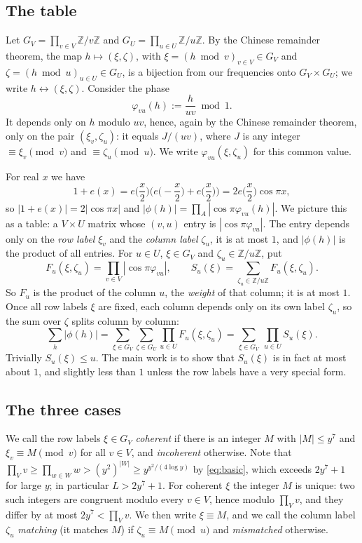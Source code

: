 \documentclass[11pt]{amsart}
\theoremstyle{definition}
\theoremstyle{remark}
\newcommand{\Z}{\mathbb{Z}}
\begin{document}
\subsection{The table}
Let $G_V=\prod_{v\in V}\Z/v\Z$ and $G_U=\prod_{u\in U}\Z/u\Z$. By the Chinese remainder theorem, the map $h\mapsto(\xi,\zeta)$, with $\xi=(h\bmod v)_{v\in V}\in G_V$ and $\zeta=(h\bmod u)_{u\in U}\in G_U$, is a bijection from our frequencies onto $G_V\times G_U$; we write $h\leftrightarrow(\xi,\zeta)$. Consider the phase
\[
 \varphi_{vu}(h):=\frac h{uv}\bmod1 .
\]
It depends only on $h$ modulo $uv$, hence, again by the Chinese remainder theorem, only on the pair $(\xi_v,\zeta_u)$: it equals $J/(uv)$, where $J$ is any integer $\equiv\xi_v\pmod v$ and $\equiv\zeta_u\pmod u$. We write $\varphi_{vu}(\xi,\zeta_u)$ for this common value.

For real $x$ we have
\begin{equation}\label{eq:half}
 1+e(x)=e\Big(\frac x2\Big)\Big(e\Big(-\frac x2\Big)+e\Big(\frac x2\Big)\Big)=2e\Big(\frac x2\Big)\cos\pi x ,
\end{equation}
so $|1+e(x)|=2|\cos\pi x|$ and $|\phi(h)|=\prod_A|\cos\pi\varphi_{vu}(h)|$. We picture this as a table: a $V\times U$ matrix whose $(v,u)$ entry is $|\cos\pi\varphi_{vu}|$. The entry depends only on the \emph{row label} $\xi_v$ and the \emph{column label} $\zeta_u$, it is at most $1$, and $|\phi(h)|$ is the product of all entries. For $u\in U$, $\xi\in G_V$ and $\zeta_u\in\Z/u\Z$, put
\[
 F_u(\xi,\zeta_u)=\prod_{v\in V}|\cos\pi\varphi_{vu}|,\qquad S_u(\xi)=\sum_{\zeta_u\in\Z/u\Z}F_u(\xi,\zeta_u).
\]
So $F_u$ is the product of the column $u$, the \emph{weight} of that column; it is at most $1$. Once all row labels $\xi$ are fixed, each column depends only on its own label $\zeta_u$, so the sum over $\zeta$ splits column by column:
\begin{equation}\label{eq:factor}
 \sum_{h}|\phi(h)|=\sum_{\xi\in G_V}\sum_{\zeta\in G_U}\prod_{u\in U}F_u(\xi,\zeta_u)=\sum_{\xi\in G_V}\ \prod_{u\in U}S_u(\xi).
\end{equation}
Trivially $S_u(\xi)\le u$. The main work is to show that $S_u(\xi)$ is in fact at most about $1$, and slightly less than $1$ unless the row labels have a very special form.

\subsection{The three cases}
We call the row labels $\xi\in G_V$ \emph{coherent} if there is an integer $M$ with $|M|\le y^7$ and $\xi_v\equiv M\pmod v$ for all $v\in V$, and \emph{incoherent} otherwise. Note that $\prod_Vv\ge\prod_{w\in W}w>(y^2)^{|W|}\ge y^{y^2/(4\log y)}$ by \eqref{eq:basic}, which exceeds $2y^7+1$ for large $y$; in particular $L>2y^7+1$. For coherent $\xi$ the integer $M$ is unique: two such integers are congruent modulo every $v\in V$, hence modulo $\prod_Vv$, and they differ by at most $2y^7<\prod_Vv$. We then write $\xi\equiv M$, and we call the column label $\zeta_u$ \emph{matching} (it matches $M$) if $\zeta_u\equiv M\pmod u$ and \emph{mismatched} otherwise.
\end{document}
